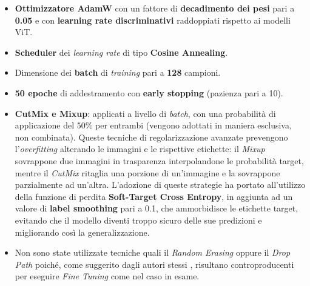 \begin{itemize}
    \item \textbf{Ottimizzatore AdamW} con un fattore di \textbf{decadimento dei pesi} pari a \textbf{0.05} e con \textbf{learning rate discriminativi} raddoppiati rispetto ai modelli ViT.
    \item \textbf{Scheduler} dei \textit{learning rate} di tipo \textbf{Cosine Annealing}.
    \item Dimensione dei \textbf{batch} di \textit{training} pari a \textbf{128}
          campioni.
    \item \textbf{50 epoche} di addestramento con \textbf{early stopping} (pazienza pari a 10).
    \item \textbf{CutMix e Mixup}: applicati a livello di \textit{batch}, con una probabilità di applicazione del $50\%$ per entrambi (vengono adottati in maniera esclusiva, non combinata). Queste tecniche di regolarizzazione avanzate prevengono l'\textit{overfitting} alterando le immagini e le rispettive etichette: il \textit{Mixup} \cite{zhang2018mixupempiricalriskminimization} sovrappone due immagini in trasparenza interpolandone le probabilità target, mentre il \textit{CutMix} \cite{yun2019cutmixregularizationstrategytrain} ritaglia una porzione di un'immagine e la sovrappone parzialmente ad un'altra. L'adozione di queste strategie ha portato all'utilizzo della funzione di perdita \textbf{Soft-Target Cross Entropy}, in aggiunta ad un valore di \textbf{label smoothing} pari a 0.1, che ammorbidisce le etichette target, evitando che il modello diventi troppo sicuro delle sue predizioni e migliorando così la generalizzazione.
    \item Non sono state utilizzate tecniche quali il \textit{Random Erasing} oppure il
          \textit{Drop Path} poiché, come suggerito dagli autori stessi
          \cite{touvron2021trainingdataefficientimagetransformers}, risultano
          controproducenti per eseguire \textit{Fine Tuning} come nel caso in esame.
\end{itemize}


